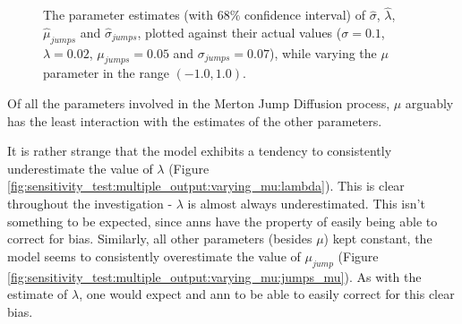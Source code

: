 \documentclass[11pt,oneside,openany,a4paper,english, report, goldenblock
]{usthesis}
\begin{document}
\begin{figure}[h]
{\begin{subfloatrow}
	\end{subfloatrow}}{
		\caption{The parameter estimates (with $68\%$ confidence interval) of $\hat{\sigma}$, $\hat{\lambda}$, $\hat{\mu}_{jumps}$ and $\hat{\sigma}_{jumps}$, plotted against their actual values ($\sigma = 0.1$, $\lambda = 0.02$, $\mu_{jumps} = 0.05$ and $\sigma_{jumps} = 0.07$), while varying the $\mu$ parameter in the range $\left(-1.0, 1.0\right)$.}
		\label{fig:sensitivity_test:multiple_output:varying_mu}}
\end{figure}
Of all the parameters involved in the Merton Jump Diffusion process, $\mu$ arguably has the least interaction with the estimates of the other parameters. 

It is rather strange that the model exhibits a tendency to consistently underestimate the value of $\lambda$ (Figure \ref{fig:sensitivity_test:multiple_output:varying_mu:lambda}). This is clear throughout the investigation - $\lambda$ is almost always underestimated. This isn't something to be expected, since \acrshort{ann}s have the property of easily being able to correct for bias.
Similarly, all other parameters (besides $\mu$) kept constant, the model seems to consistently overestimate the value of $\mu_{jump}$ (Figure \ref{fig:sensitivity_test:multiple_output:varying_mu:jumps_mu}). As with the estimate of $\lambda$, one would expect and \acrshort{ann} to be able to easily correct for this clear bias.
\end{document}
